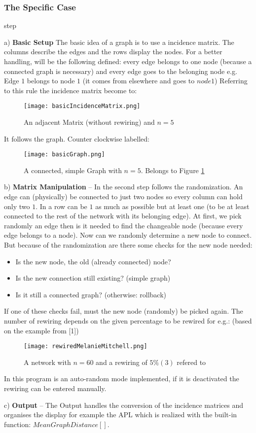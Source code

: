 \documentclass[11pt,a4paper]{article}
\begin{document}
 \subsubsection{The Specific Case}
\begin{labeling}{step}
\item [a)] \textbf{Basic Setup} The  basic idea of a graph is to use a incidence matrix. The columns describe the edges and the rows display the nodes. For a better handling, will be the following defined: every edge belongs to one node (because a connected graph is necessary) and every edge goes to the belonging node e.g.
Edge \(1\) belongs to node \(1\) (it comes from elsewhere and goes to \(node 1\))
Referring to this rule the incidence matrix become to:
\begin{figure}[h]
\centering
\texttt{[image: basicIncidenceMatrix.png]}
\caption{An adjacent Matrix (without rewiring) and \(n=5\)}
\label{fig:basicMatrix}
\end{figure}
It follows the graph. Counter clockwise labelled:
\begin{figure}[h]
\centering
\texttt{[image: basicGraph.png]}
\caption{A connected, simple Graph with \(n=5\). Belongs to Figure \ref{fig:basicMatrix}}
\end{figure}
\item [b)] \textbf{Matrix Manipulation} – In the second step follows the randomization. An edge can (physically) be connected to just two nodes so every column can hold only two \(1\). In a row can be \(1\) as much as possible but at least one (to be at least connected to the rest of the network with its belonging edge). At first, we pick randomly an edge then is it needed to find the changeable node (because every edge belongs to a node). Now can we randomly determine a new node to connect. But because of the randomization are there some checks for the new node needed:
\begin{itemize}  
\item Is the new node, the old (already connected) node? 
\item Is the new connection still existing? (simple graph) 
\item Is it still a connected graph? (otherwise: rollback)
\end{itemize}
If one of these checks fail, must the new node (randomly) be picked again. The number of rewiring depends on the given percentage to be rewired for e.g.: (based on the example from [1])
\begin{figure}[h]
\centering
\texttt{[image: rewiredMelanieMitchell.png]}
\caption{A network with \(n=60\) and a rewiring of \(5\%(3)\) refered to \cite{melanie}}
\end{figure}
In this program is an auto-random mode implemented, if it is deactivated the rewiring can be entered manually.
\item [c)] \textbf{Output} – The Output handles the conversion of the incidence matrices and organises the display for example the APL which is realized with the built-in function: \(MeanGraphDistance[]\).
\end{labeling}
\end{document}
